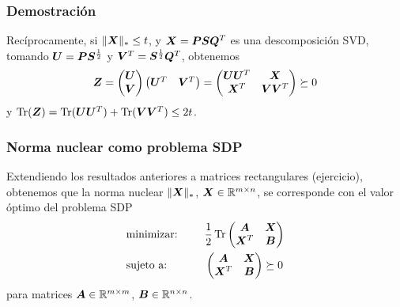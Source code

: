 \documentclass[aspectratio=169,12pt,spanish]{beamer}
\begin{document}
\begin{frame}
\frametitle{Demostración}

Recíprocamente, si $\|\bm{X}\|_* \le t$,
y $\bm{X} = \bm{P} \bm{S} \bm{Q}^T$ es una descomposición SVD, tomando
$\bm{U} = \bm{P} \bm{S}^{\frac12}$ y $\bm{V}^T = \bm{S}^{\frac12} \bm{Q}^T$, obtenemos
$$
\bm{Z} = \begin{pmatrix} \bm{U} \\ \bm{V} \end{pmatrix}
\begin{pmatrix} \bm{U}^T & \bm{V}^T \end{pmatrix} = \begin{pmatrix} \bm{U}\bm{U}^T & \bm{X} \\ \bm{X}^T & \bm{V} \bm{V}^T \end{pmatrix} \succeq 0$$
y $\operatorname{Tr}(\bm{Z}) = \operatorname{Tr}(\bm{U}\bm{U}^T) + \operatorname{Tr}(\bm{V}\bm{V}^T) \le 2t$.

\end{frame}


\begin{frame}
\frametitle{Norma nuclear como problema SDP}

Extendiendo los resultados anteriores a matrices rectangulares (ejercicio), obtenemos que la norma nuclear $\|\bm{X}\|_*$, $\bm{X} \in \mathbb{R}^{m \times n}$, se corresponde con el valor óptimo del problema SDP
\begin{alignat*}{2}
  & \text{minimizar: } & & \frac{1}{2}\operatorname{Tr} \begin{pmatrix} \bm{A} & \bm{X} \\ \bm{X}^T & \bm{B} \end{pmatrix} \\
   & \text{sujeto a: } & \quad & \begin{pmatrix} \bm{A} & \bm{X} \\ \bm{X}^T & \bm{B} \end{pmatrix}   \succeq 0
\end{alignat*}
para matrices $\bm{A} \in \mathbb{R}^{m \times m}$, $\bm{B} \in \mathbb{R}^{n \times n}$.

\end{frame}

\end{document}
